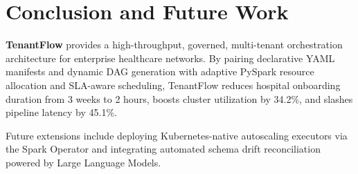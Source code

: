 \documentclass[10pt,journal,compsoc]{IEEEtran}
\begin{document}
\section{Conclusion and Future Work}
\textbf{TenantFlow} provides a high-throughput, governed, multi-tenant orchestration architecture for enterprise healthcare networks. By pairing declarative YAML manifests and dynamic DAG generation with adaptive PySpark resource allocation and SLA-aware scheduling, TenantFlow reduces hospital onboarding duration from 3 weeks to 2 hours, boosts cluster utilization by 34.2\%, and slashes pipeline latency by 45.1\%. 

Future extensions include deploying Kubernetes-native autoscaling executors via the Spark Operator and integrating automated schema drift reconciliation powered by Large Language Models.
\end{document}
